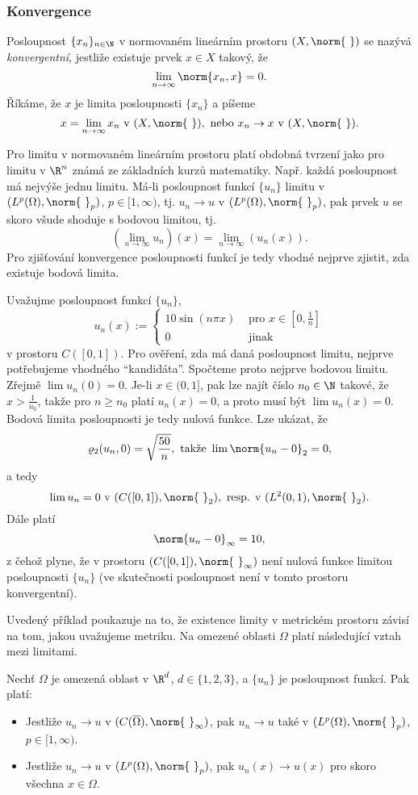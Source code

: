 \subsubsection{Konvergence}
% 
\begin{df}
Posloupnost $\{x_n\}_{n\in\N}$ v normovaném lineárním prostoru $(X,\norm{\ })$ se nazývá \emph{konvergentní}, jestliže existuje prvek $x\in X$ takový, že
\[ \lim_{n\to\infty} \norm{x_n,x} = 0. \]
Říkáme, že $x$ je limita posloupnosti $\{x_n\}$ a píšeme
\[ x=\lim_{n\to\infty} x_n \mbox{ v }(X,\norm{\ }), \mbox{ nebo }x_n\to x \mbox{ v }(X,\norm{\ }). \]
\end{df}
% 
Pro limitu v normovaném lineárním prostoru platí obdobná tvrzení jako pro limitu v $\R^n$ známá ze základních kurzů matematiky.
Např. každá posloupnost má nejvýše jednu limitu.
Má-li posloupnost funkcí $\{u_n\}$ limitu v $(L^p(\Omega),\norm{\ }_p)$, $p\in[1,\infty)$, tj. $u_n\to u$ v $(L^p(\Omega),\norm{\ }_p)$, pak prvek $u$ se skoro všude shoduje s bodovou limitou, tj.
\[ (\lim_{n\to\infty} u_n)(x) = \lim_{n\to\infty} (u_n(x)). \]
Pro zjišťování konvergence posloupnosti funkcí je tedy vhodné nejprve zjistit, zda existuje bodová limita.

\begin{ex}
Uvažujme posloupnost funkcí $\{u_n\}$,
\[ u_n(x) := \begin{cases}10\sin(n\pi x) & \mbox{ pro }x\in[0,\frac1n]\\0 & \mbox{ jinak}\end{cases} \]
v prostoru $C([0,1])$.
Pro ověření, zda má daná posloupnost limitu, nejprve potřebujeme vhodného ``kandidáta''.
Spočteme proto nejprve bodovou limitu.
Zřejmě $\lim u_n(0)=0$.
Je-li $x\in(0,1]$, pak lze najít číslo $n_0\in\N$ takové, že $x>\frac1{n_0}$, takže pro $n\ge n_0$ platí $u_n(x)=0$, a proto musí být $\lim u_n(x) = 0$.
Bodová limita posloupnosti je tedy nulová funkce.
Lze ukázat, že
\[ \varrho_2(u_n,0) = \sqrt{\frac{50}n}, \mbox{ takže }\lim \norm{u_n-0}_2=0, \]
a tedy
\[ \lim u_n = 0 \mbox{ v }(C([0,1]),\norm{\ }_2), \mbox{ resp. v }(L^2(0,1),\norm{\ }_2). \]
Dále platí
\[ \norm{u_n-0}_\infty = 10, \]
z čehož plyne, že v prostoru $(C([0,1]),\norm{\ }_\infty)$ není nulová funkce limitou posloupnosti $\{u_n\}$ (ve skutečnosti posloupnost není v tomto prostoru konvergentní).
\end{ex}
% 
Uvedený příklad poukazuje na to, že existence limity v metrickém prostoru závisí na tom, jakou uvažujeme metriku.
Na omezené oblasti $\Omega$ platí následující vztah mezi limitami.
\begin{veta}
Nechť $\Omega$ je omezená oblast v $\R^d$, $d\in\{1,2,3\}$, a $\{u_n\}$ je posloupnost funkcí.
Pak platí:
\begin{itemize}
\item[(i)] Jestliže $u_n\to u$ v $(C(\overline\Omega),\norm{\ }_\infty)$, pak $u_n\to u$ také v $(L^p(\Omega),\norm{\ }_p)$, $p\in[1,\infty)$.
\item[(ii)] Jestliže $u_n\to u$ v $(L^p(\Omega),\norm{\ }_p)$, pak $u_n(x)\to u(x)$ pro skoro všechna $x\in\Omega$.
\end{itemize}
\end{veta}

